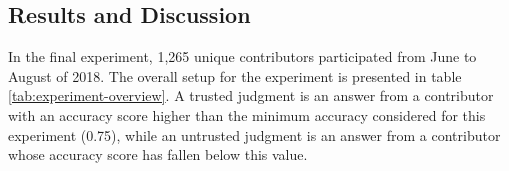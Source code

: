\subsection{\hspace*{3pt} Results and Discussion}

In the final experiment, 1,265 unique contributors participated from June to August of 2018. The overall setup for the experiment is presented in table \ref{tab:experiment-overview}. A trusted judgment is an answer from a contributor with an accuracy score higher than the minimum accuracy considered for this experiment (0.75), while an untrusted judgment is an answer from a contributor whose accuracy score has fallen below this value.

\begin{table}[H]

\centering
\caption{Overall setup for the experiment with crowd workers}
\label{tab:experiment-overview}
\end{table}

